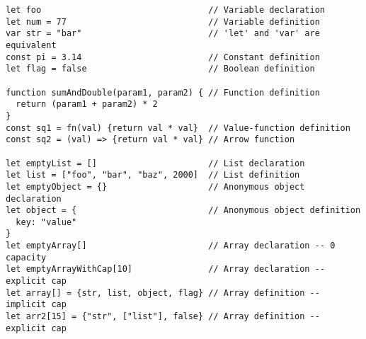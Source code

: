 \vspace{-2.25em}
\begin{center}
\begin{minipage}[t]{1\textwidth}
\begin{listing}[H]
\begin{spacing}{0.6}
\begin{verbatim}
let foo                                 // Variable declaration
let num = 77                            // Variable definition
var str = "bar"                         // 'let' and 'var' are equivalent
const pi = 3.14                         // Constant definition
let flag = false                        // Boolean definition

function sumAndDouble(param1, param2) { // Function definition
  return (param1 + param2) * 2
}
const sq1 = fn(val) {return val * val}  // Value-function definition
const sq2 = (val) => {return val * val} // Arrow function

let emptyList = []                      // List declaration
let list = ["foo", "bar", "baz", 2000]  // List definition
let emptyObject = {}                    // Anonymous object declaration
let object = {                          // Anonymous object definition
  key: "value"
}
let emptyArray[]                        // Array declaration -- 0 capacity
let emptyArrayWithCap[10]               // Array declaration -- explicit cap
let array[] = {str, list, object, flag} // Array definition -- implicit cap
let arr2[15] = {"str", ["list"], false} // Array definition -- explicit cap
\end{verbatim}
\end{spacing}
\end{listing}
\end{minipage}
\end{center}
